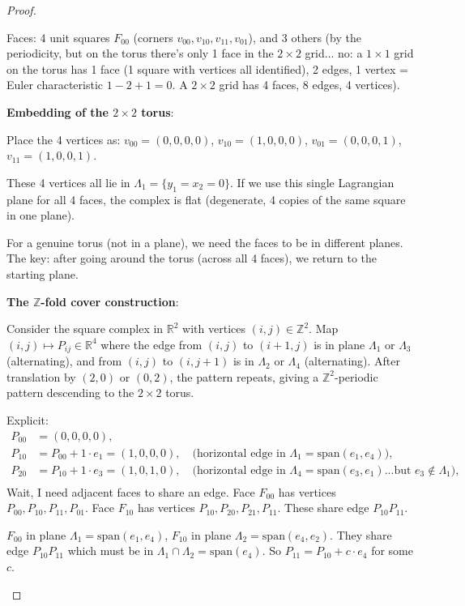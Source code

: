 \documentclass[12pt]{article}
\theoremstyle{definition}
\begin{document}
\begin{proof}
\begin{itemize}
Faces: 4 unit squares $F_{00}$ (corners $v_{00},v_{10},v_{11},v_{01}$), and 3 others (by the periodicity, but on the torus there's only 1 face in the $2\times 2$ grid... no: a $1\times 1$ grid on the torus has 1 face (1 square with vertices all identified), 2 edges, 1 vertex = Euler characteristic $1-2+1 = 0$. A $2\times 2$ grid has 4 faces, 8 edges, 4 vertices).

\textbf{Embedding of the $2\times 2$ torus}:

Place the 4 vertices as:
$v_{00} = (0,0,0,0)$, $v_{10} = (1,0,0,0)$, $v_{01} = (0,0,0,1)$, $v_{11} = (1,0,0,1)$.

These 4 vertices all lie in $\Lambda_1 = \{y_1=x_2=0\}$. If we use this single Lagrangian plane for all 4 faces, the complex is flat (degenerate, 4 copies of the same square in one plane).

For a genuine torus (not in a plane), we need the faces to be in different planes. The key: after going around the torus (across all 4 faces), we return to the starting plane.

\textbf{The $\mathbb{Z}$-fold cover construction}:

Consider the square complex in $\mathbb{R}^2$ with vertices $(i,j)\in\mathbb{Z}^2$. Map $(i,j)\mapsto P_{ij}\in\mathbb{R}^4$ where the edge from $(i,j)$ to $(i+1,j)$ is in plane $\Lambda_1$ or $\Lambda_3$ (alternating), and from $(i,j)$ to $(i,j+1)$ is in $\Lambda_2$ or $\Lambda_4$ (alternating). After translation by $(2,0)$ or $(0,2)$, the pattern repeats, giving a $\mathbb{Z}^2$-periodic pattern descending to the $2\times 2$ torus.

Explicit:
\begin{align*}
P_{00} &= (0,0,0,0),\\
P_{10} &= P_{00} + 1\cdot e_1 = (1,0,0,0), \quad\text{(horizontal edge in }\Lambda_1 = \mathrm{span}(e_1,e_4)),\\
P_{20} &= P_{10} + 1\cdot e_3 = (1,0,1,0), \quad\text{(horizontal edge in }\Lambda_4 = \mathrm{span}(e_3,e_1)... \text{but }e_3\notin\Lambda_1),\\
\end{align*}
Wait, I need adjacent faces to share an edge. Face $F_{00}$ has vertices $P_{00},P_{10},P_{11},P_{01}$. Face $F_{10}$ has vertices $P_{10},P_{20},P_{21},P_{11}$. These share edge $P_{10}P_{11}$.

$F_{00}$ in plane $\Lambda_1 = \mathrm{span}(e_1,e_4)$, $F_{10}$ in plane $\Lambda_2 = \mathrm{span}(e_4,e_2)$. They share edge $P_{10}P_{11}$ which must be in $\Lambda_1\cap\Lambda_2 = \mathrm{span}(e_4)$. So $P_{11} = P_{10} + c\cdot e_4$ for some $c$.


\end{itemize}
\end{proof}
\end{document}
